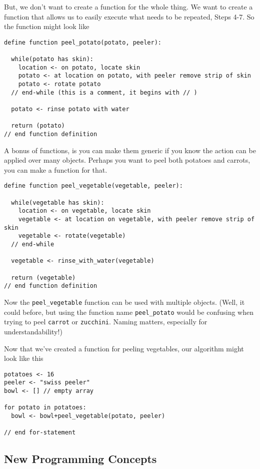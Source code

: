 \documentclass[
]{book}
\begin{document}
But, we don't want to create a function for the whole thing. We want to create a function that allows us to easily execute what needs to be repeated, Steps 4-7. So the function might look like

\begin{verbatim}
define function peel_potato(potato, peeler):

  while(potato has skin):
    location <- on potato, locate skin
    potato <- at location on potato, with peeler remove strip of skin
    potato <- rotate potato
  // end-while (this is a comment, it begins with // )
  
  potato <- rinse potato with water
  
  return (potato)
// end function definition
\end{verbatim}

A bonus of functions, is you can make them generic if you know the action can be applied over many objects. Perhaps you want to peel both potatoes and carrots, you can make a function for that.

\begin{verbatim}
define function peel_vegetable(vegetable, peeler):

  while(vegetable has skin):
    location <- on vegetable, locate skin
    vegetable <- at location on vegetable, with peeler remove strip of skin
    vegetable <- rotate(vegetable)
  // end-while
  
  vegetable <- rinse_with_water(vegetable)
  
  return (vegetable)
// end function definition
\end{verbatim}

Now the \texttt{peel\_vegetable} function can be used with multiple objects. (Well, it could before, but using the function name \texttt{peel\_potato} would be confusing when trying to peel \texttt{carrot} or \texttt{zucchini}. Naming matters, especially for understandability!)

Now that we've created a function for peeling vegetables, our algorithm might look like this

\begin{verbatim}
potatoes <- 16
peeler <- "swiss peeler"
bowl <- [] // empty array

for potato in potatoes:
  bowl <- bowl+peel_vegetable(potato, peeler)

// end for-statement  
\end{verbatim}

\subsection{New Programming Concepts}\label{new-programming-concepts}
\end{document}
